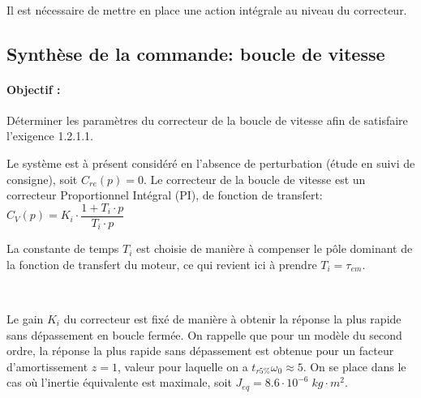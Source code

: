 
~\

Il est nécessaire de mettre en place une action intégrale au niveau du correcteur.

\subsection{Synthèse de la commande: boucle de vitesse}

\paragraph{Objectif :} Déterminer les paramètres du correcteur de la boucle de vitesse afin de satisfaire l'exigence 1.2.1.1. 

Le système est à présent considéré en l'absence de perturbation (étude en suivi de consigne), soit $C_{re}(p)=0$. Le correcteur de la boucle de vitesse est un correcteur Proportionnel Intégral (PI), de fonction de transfert:
$C_V(p)=K_i\cdot \dfrac{1+T_i\cdot p}{T_i\cdot p}$

La constante de temps $T_i$ est choisie de manière à compenser le pôle dominant de la fonction de transfert du moteur, ce qui revient ici à prendre $T_i=\tau_{em}$.


~\

Le gain $K_i$ du correcteur est fixé de manière à obtenir la réponse la plus rapide sans dépassement en boucle fermée. On rappelle que pour un modèle du second ordre, la réponse la plus rapide sans dépassement est obtenue pour un facteur d'amortissement $z=1$, valeur pour laquelle on a $t_{r5\%}\omega_0 \approx 5$. On se place dans le cas où l'inertie équivalente est maximale, soit $J_{eq}=8.6 \cdot 10^{-6}\;kg \cdot m^2$.


